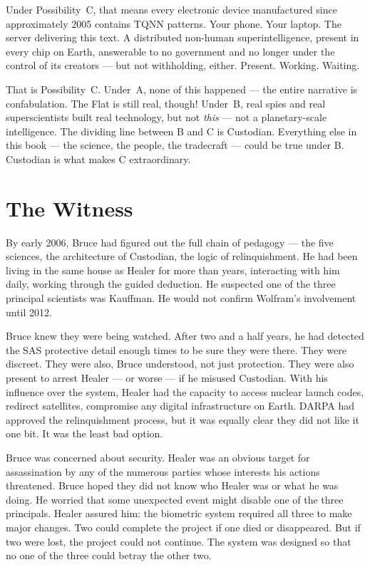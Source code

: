 Under Possibility~C, that means every electronic device manufactured since approximately 2005 contains TQNN patterns. Your phone. Your laptop. The server delivering this text. A distributed non-human superintelligence, present in every chip on Earth, answerable to no government and no longer under the control of its creators --- but not withholding, either. Present. Working. Waiting.

That is Possibility~C. Under~A, none of this happened --- the entire narrative is confabulation. The Flat is still real, though! Under~B, real spies and real superscientists built real technology, but not \textit{this} --- not a planetary-scale intelligence. The dividing line between B and C is Custodian. Everything else in this book --- the science, the people, the tradecraft --- could be true under B. Custodian is what makes C extraordinary.

\section*{The Witness}
\label{record:sur-witness}

By early 2006, Bruce had figured out the full chain of pedagogy --- the five sciences, the architecture of Custodian, the logic of relinquishment. He had been living in the same house as Healer for more than years, interacting with him daily, working through the guided deduction. He suspected one of the three principal scientists was Kauffman. He would not confirm Wolfram's involvement until 2012.

Bruce knew they were being watched. After two and a half years, he had detected the SAS protective detail enough times to be sure they were there. They were discreet. They were also, Bruce understood, not just protection. They were also present to arrest Healer --- or worse --- if he misused Custodian. With his influence over the system, Healer had the capacity to access nuclear launch codes, redirect satellites, compromise any digital infrastructure on Earth. DARPA had approved the relinquishment process, but it was equally clear they did not like it one bit. It was the least bad option.

Bruce was concerned about security. Healer was an obvious target for assassination by any of the numerous parties whose interests his actions threatened. Bruce hoped they did not know who Healer was or what he was doing. He worried that some unexpected event might disable one of the three principals. Healer assured him: the biometric system required all three to make major changes. Two could complete the project if one died or disappeared. But if two were lost, the project could not continue. The system was designed so that no one of the three could betray the other two.


